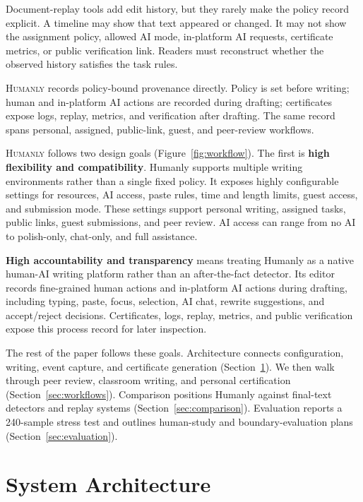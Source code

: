 \documentclass[11pt]{article}
\begin{document}
Document-replay tools add edit history, but they rarely make the policy record explicit. A timeline may show that text appeared or changed. It may not show the assignment policy, allowed AI mode, in-platform AI requests, certificate metrics, or public verification link. Readers must reconstruct whether the observed history satisfies the task rules.

\textsc{Humanly} records policy-bound provenance directly. Policy is set before writing; human and in-platform AI actions are recorded during drafting; certificates expose logs, replay, metrics, and verification after drafting. The same record spans personal, assigned, public-link, guest, and peer-review workflows.

\textsc{Humanly} follows two design goals (Figure~\ref{fig:workflow}). The first is \textbf{high flexibility and compatibility}. Humanly supports multiple writing environments rather than a single fixed policy. It exposes highly configurable settings for resources, AI access, paste rules, time and length limits, guest access, and submission mode. These settings support personal writing, assigned tasks, public links, guest submissions, and peer review. AI access can range from no AI to polish-only, chat-only, and full assistance.

\textbf{High accountability and transparency} means treating Humanly as a native human-AI writing platform rather than an after-the-fact detector. Its editor records fine-grained human actions and in-platform AI actions during drafting, including typing, paste, focus, selection, AI chat, rewrite suggestions, and accept/reject decisions. Certificates, logs, replay, metrics, and public verification expose this process record for later inspection.

The rest of the paper follows these goals. Architecture connects configuration, writing, event capture, and certificate generation (Section~\ref{sec:architecture}). We then walk through peer review, classroom writing, and personal certification (Section~\ref{sec:workflows}). Comparison positions Humanly against final-text detectors and replay systems (Section~\ref{sec:comparison}). Evaluation reports a 240-sample stress test and outlines human-study and boundary-evaluation plans (Section~\ref{sec:evaluation}).

\section{System Architecture}
\label{sec:architecture}
\end{document}
